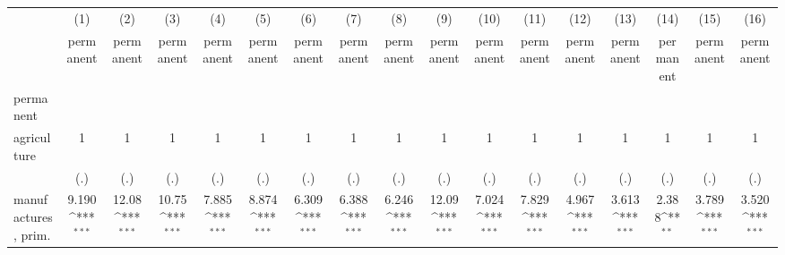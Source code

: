 {
\def\sym#1{\ifmmode^{#1}\else\(^{#1}\)\fi}
\begin{tabular}{l*{16}{c}}
\hline\hline
                    &\multicolumn{1}{c}{(1)}&\multicolumn{1}{c}{(2)}&\multicolumn{1}{c}{(3)}&\multicolumn{1}{c}{(4)}&\multicolumn{1}{c}{(5)}&\multicolumn{1}{c}{(6)}&\multicolumn{1}{c}{(7)}&\multicolumn{1}{c}{(8)}&\multicolumn{1}{c}{(9)}&\multicolumn{1}{c}{(10)}&\multicolumn{1}{c}{(11)}&\multicolumn{1}{c}{(12)}&\multicolumn{1}{c}{(13)}&\multicolumn{1}{c}{(14)}&\multicolumn{1}{c}{(15)}&\multicolumn{1}{c}{(16)}\\
                    &\multicolumn{1}{c}{permanent}&\multicolumn{1}{c}{permanent}&\multicolumn{1}{c}{permanent}&\multicolumn{1}{c}{permanent}&\multicolumn{1}{c}{permanent}&\multicolumn{1}{c}{permanent}&\multicolumn{1}{c}{permanent}&\multicolumn{1}{c}{permanent}&\multicolumn{1}{c}{permanent}&\multicolumn{1}{c}{permanent}&\multicolumn{1}{c}{permanent}&\multicolumn{1}{c}{permanent}&\multicolumn{1}{c}{permanent}&\multicolumn{1}{c}{permanent}&\multicolumn{1}{c}{permanent}&\multicolumn{1}{c}{permanent}\\
\hline
permanent           &                     &                     &                     &                     &                     &                     &                     &                     &                     &                     &                     &                     &                     &                     &                     &                     \\
agriculture         &           1         &           1         &           1         &           1         &           1         &           1         &           1         &           1         &           1         &           1         &           1         &           1         &           1         &           1         &           1         &           1         \\
                    &         (.)         &         (.)         &         (.)         &         (.)         &         (.)         &         (.)         &         (.)         &         (.)         &         (.)         &         (.)         &         (.)         &         (.)         &         (.)         &         (.)         &         (.)         &         (.)         \\
[1em]
manufactures, prim. &       9.190\sym{***}&       12.08\sym{***}&       10.75\sym{***}&       7.885\sym{***}&       8.874\sym{***}&       6.309\sym{***}&       6.388\sym{***}&       6.246\sym{***}&       12.09\sym{***}&       7.024\sym{***}&       7.829\sym{***}&       4.967\sym{***}&       3.613\sym{***}&       2.388\sym{**} &       3.789\sym{***}&       3.520\sym{***}\\

\end{tabular}}
